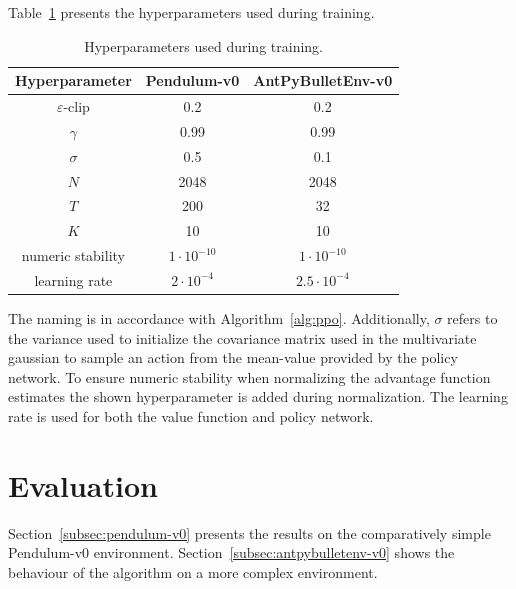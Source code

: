 Table~\ref{tab:hyp} presents the hyperparameters used during training.
\begin{table}[t]
    \centering
    \begin{tabular}{c|c | c}
        \toprule
        Hyperparameter & Pendulum-v0 &  AntPyBulletEnv-v0\\
        \midrule
        $\varepsilon$-clip & 0.2 & 0.2\\
        $\gamma$ & 0.99 & 0.99\\
        $\sigma$ & 0.5 & 0.1\\
        $N$ & 2048 & 2048\\
        $T$ & 200 & 32\\
        $K$ & 10 & 10\\
        numeric stability & $1\cdot 10^{-10}$ & $1\cdot 10^{-10}$\\
        learning rate & $2\cdot 10^{-4}$ & $2.5\cdot 10^{-4}$\\
        \bottomrule
    \end{tabular}
    \caption{Hyperparameters used during training.}
    \label{tab:hyp}
\end{table}
The naming is in accordance with Algorithm~\ref{alg:ppo}.
Additionally, $\sigma$ refers to the variance used to initialize the covariance matrix used in the multivariate gaussian
to sample an action from the mean-value provided by the policy network.
To ensure numeric stability when normalizing the advantage function estimates the shown hyperparameter is added
during normalization.
The learning rate is used for both the value function and policy network.

\section{Evaluation}\label{sec:evaluation}
Section~\ref{subsec:pendulum-v0} presents the results on the comparatively simple Pendulum-v0 environment.
Section~\ref{subsec:antpybulletenv-v0} shows the behaviour of the algorithm on a more complex environment.

